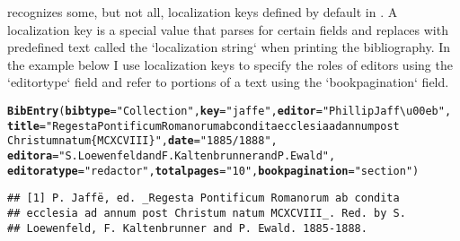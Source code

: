 \documentclass[article]{jss}\usepackage[]{graphicx}\usepackage[]{color}
\makeatletter
\newcommand{\hlstr}[1]{\textcolor[rgb]{0.125,0.125,1}{#1}}%
\newcommand{\hlstd}[1]{\textcolor[rgb]{0.251,0.251,0.282}{#1}}%
\newcommand{\hlkwc}[1]{\textcolor[rgb]{0.529,0,0.184}{\textbf{#1}}}%
\newcommand{\hlkwd}[1]{\textcolor[rgb]{0.251,0.251,0.282}{\textbf{#1}}}%
\newenvironment{kframe}{%
 \def\at@end@of@kframe{}%
 \ifinner\ifhmode%
  \def\at@end@of@kframe{\end{minipage}}%
  \begin{minipage}{\columnwidth}%
 \fi\fi%
 \def\FrameCommand##1{\hskip\@totalleftmargin \hskip-\fboxsep
 \colorbox{shadecolor}{##1}\hskip-\fboxsep
     \hskip-\linewidth \hskip-\@totalleftmargin \hskip\columnwidth}%
 \MakeFramed {\advance\hsize-\width
   \@totalleftmargin\z@ \linewidth\hsize
   \@setminipage}}%
 {\par\unskip\endMakeFramed%
 \at@end@of@kframe}
\newenvironment{knitrout}{}{} %
\newcommand{\ourpkg}{\pkg{RefManageR}}
\makeatother
\begin{document}
\ourpkg{} recognizes some, but not all, localization keys defined by default in \Biblatex{}.  A localization key is a special value that \Biblatex{} parses for certain fields and replaces with predefined text called the `localization string` when printing the bibliography.  In the example below I use localization keys to specify the roles of editors using the `editortype` field and refer to portions of a text using the `bookpagination` field.
\begin{knitrout}
\color{fgcolor}\begin{kframe}
\begin{alltt}
\hlkwd{BibEntry}\hlstd{(}\hlkwc{bibtype}\hlstd{=}\hlstr{"Collection"}\hlstd{,} \hlkwc{key} \hlstd{=} \hlstr{"jaffe"}\hlstd{,} \hlkwc{editor} \hlstd{=} \hlstr{"Phillip Jaff\textbackslash{}u00eb"}\hlstd{,}
  \hlkwc{title} \hlstd{=} \hlstr{"Regesta Pontificum Romanorum ab condita ecclesia ad annum post
  Christum natum \{MCXCVIII\}"}\hlstd{,} \hlkwc{date} \hlstd{=} \hlstr{"1885/1888"}\hlstd{,}
  \hlkwc{editora} \hlstd{=} \hlstr{"S. Loewenfeld and F. Kaltenbrunner and P. Ewald"}\hlstd{,}
  \hlkwc{editoratype} \hlstd{=} \hlstr{"redactor"}\hlstd{,} \hlkwc{totalpages} \hlstd{=} \hlstr{"10"}\hlstd{,} \hlkwc{bookpagination} \hlstd{=} \hlstr{"section"}\hlstd{)}
\end{alltt}
\begin{verbatim}
## [1] P. Jaffë, ed. _Regesta Pontificum Romanorum ab condita
## ecclesia ad annum post Christum natum MCXCVIII_. Red. by S.
## Loewenfeld, F. Kaltenbrunner and P. Ewald. 1885-1888.
\end{verbatim}
\end{kframe}
\end{knitrout}
\end{document}
